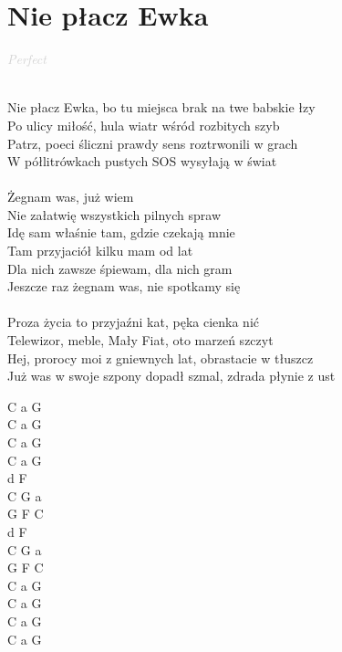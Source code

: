 \documentclass[a5paper, 10pt]{book}
\begin{document}
\section{Nie płacz Ewka}\textcolor{lightgray}{\textit{Perfect}}\\~\\
\begin{minipage}[t]{0.8\textwidth}
  Nie płacz Ewka, bo tu miejsca brak na twe babskie łzy\\
  Po ulicy miłość, hula wiatr wśród rozbitych szyb\\
  Patrz, poeci śliczni prawdy sens roztrwonili w grach\\
  W półlitrówkach pustych SOS wysyłają w świat\\
  \\
  \hspace*{5mm}Żegnam was, już wiem\\
  \hspace*{5mm}Nie załatwię wszystkich pilnych spraw\\
  \hspace*{5mm}Idę sam właśnie tam, gdzie czekają mnie\\
  \hspace*{5mm}Tam przyjaciół kilku mam od lat\\
  \hspace*{5mm}Dla nich zawsze śpiewam, dla nich gram\\
  \hspace*{5mm}Jeszcze raz żegnam was, nie spotkamy się\\
  \\
  Proza życia to przyjaźni kat, pęka cienka nić\\
  Telewizor, meble, Mały Fiat, oto marzeń szczyt\\
  Hej, prorocy moi z gniewnych lat, obrastacie w tłuszcz\\
  Już was w swoje szpony dopadł szmal, zdrada płynie z ust\\
\end{minipage}
\begin{minipage}[t]{0.2\textwidth}
  C a G\\
  C a G\\
  C a G\\
  C a G\\

  d F \\
  C G a\\
  G F C\\
  d F \\
  C G a\\
  G F C\\

  C a G\\
  C a G\\
  C a G\\
  C a G\\
\end{minipage}
\end{document}
